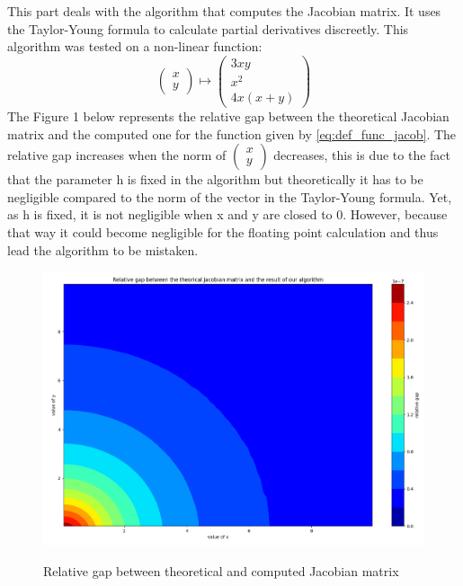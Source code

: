 \documentclass{article}
\newcommand{\tvect}[2]{ \begin{pmatrix} #1 \\ #2 \end{pmatrix} }
\begin{document}
This part deals with the algorithm that computes the Jacobian matrix. It uses the Taylor-Young formula to calculate partial derivatives discreetly. This algorithm was tested on a non-linear function:
\begin{equation}
  \label{eq:def_func_jacob}
  \begin{pmatrix}
    x \\
    y
  \end{pmatrix}
  \mapsto
  \begin{pmatrix}
    3xy \\
    x^2 \\
    4x(x+y)
  \end{pmatrix}
\end{equation}
The Figure 1  below represents the relative gap between the theoretical Jacobian matrix and the computed one for the function given by \eqref{eq:def_func_jacob}. The relative gap increases when the norm of $\tvect{x}{y}$ decreases, this is due to the fact that the parameter h is fixed in the algorithm but theoretically it has to be negligible compared to the norm of the vector in the Taylor-Young formula. Yet, as h is fixed, it is not negligible when x and y are closed to 0. However, because that way it could become negligible for the floating point calculation and thus lead the algorithm to be mistaken.

\begin{figure}[h]
  \includegraphics[scale=0.3]{rel_gap_jacob.png}
  \label{fig:rel_gap_jacob}
  \caption{Relative gap between theoretical and computed Jacobian matrix}
\end{figure}
\end{document}
